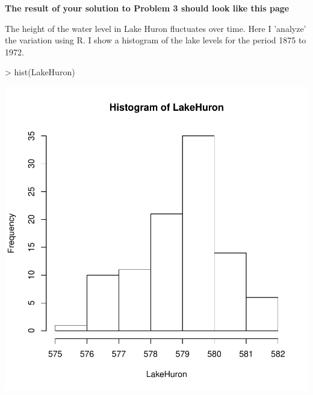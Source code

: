 \documentclass{article}
\begin{document}

\noindent \textbf{The result of your solution to Problem 3 should look like this page}


The height of the water level in Lake Huron fluctuates over time. Here I 'analyze' the variation using R. I show a histogram of the lake levels for the period 1875 to 1972.

\begin{Schunk}
\begin{Sinput}
> hist(LakeHuron)
\end{Sinput}
\end{Schunk}
\includegraphics{p3-001}

\begin{Schunk}
\end{Schunk}
\end{document}
